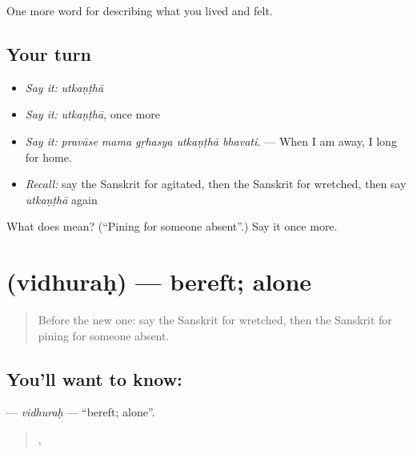 \begin{grammarlens}[title={What you've built}]
One more word for describing what you lived and felt.
\end{grammarlens}

\subsection*{Your turn}
\begin{itemize}
\raggedright
  \item \emph{Say it:} \emph{utkaṇṭhā}
  \item \emph{Say it:} \emph{utkaṇṭhā}, once more
  \item \emph{Say it:} \emph{pravāse mama gṛhasya utkaṇṭhā bhavati.} — When I am away, I long for home.
  \item \emph{Recall:} say the Sanskrit for agitated, then the Sanskrit for wretched, then say \emph{utkaṇṭhā} again
\end{itemize}

\begin{tcolorbox}[breakable,colback=teal!4,colframe=teal!35!black,title={Before you move on}]
What does  mean? (\textquotedblleft{}Pining for someone absent\textquotedblright{}.) Say it once more.
\end{tcolorbox}
\section[\texorpdfstring{\sk{विधुरः} (vidhuraḥ)}{विधुरः (vidhuraḥ)}]{ (vidhuraḥ) — bereft; alone}

\label{lesson:SA-C453-vidhurah}



\begin{quote}
Before the new one: say the Sanskrit for wretched, then the Sanskrit for pining for someone absent.
\end{quote}

\subsection*{You'll want to know: }
\textbf{} — \emph{vidhuraḥ} — \textquotedblleft{}bereft; alone\textquotedblright{}.

\begin{quote}
  ,    
\end{quote}

